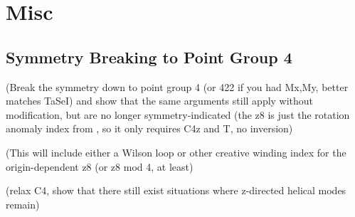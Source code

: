 \section{Misc}
\subsection{Symmetry Breaking to Point Group 4}

{\color{red}(Break the symmetry down to point group 4 (or 422 if you had Mx,My, better matches TaSeI) and show that the same arguments still apply without modification, but are no longer symmetry-indicated (the z8 is just the rotation anomaly index from \cite{TCISurfaceRotationAnomaly}, so it only requires C4z and T, no inversion)

(This will include either a Wilson loop or other creative winding index for the origin-dependent z8 (or z8 mod 4, at least)

(relax C4, show that there still exist situations where z-directed helical modes remain)}

